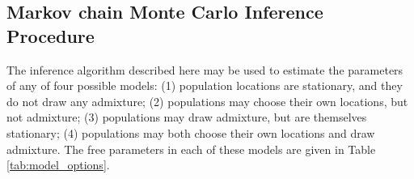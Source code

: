 \documentclass[12pt]{article}
\begin{document}
%

\subsection*{Markov chain Monte Carlo Inference Procedure}
The inference algorithm described here may be used to estimate the parameters of any of four possible models: (1) population locations are stationary, and they do not draw any admixture; (2) populations may choose their own locations, but not admixture; (3) populations may draw admixture, but are themselves stationary; (4) populations may both choose their own locations and draw admixture.  The free parameters in each of these models are given in Table \ref{tab:model_options}.
\end{document}
